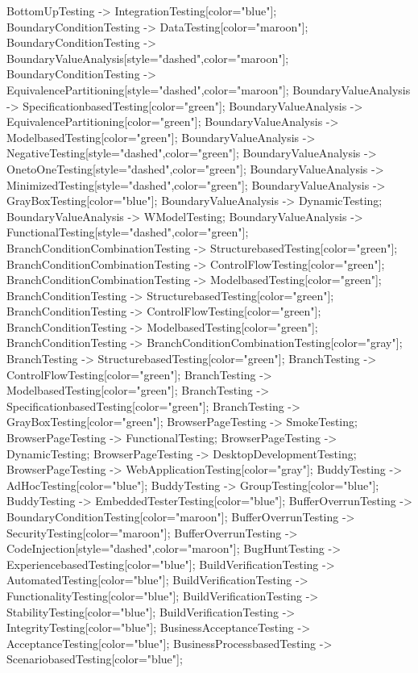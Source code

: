 \documentclass{article}
\begin{document}
{BottomUpTesting -> IntegrationTesting[color="blue"];
BoundaryConditionTesting -> DataTesting[color="maroon"];
BoundaryConditionTesting -> BoundaryValueAnalysis[style="dashed",color="maroon"];
BoundaryConditionTesting -> EquivalencePartitioning[style="dashed",color="maroon"];
BoundaryValueAnalysis -> SpecificationbasedTesting[color="green"];
BoundaryValueAnalysis -> EquivalencePartitioning[color="green"];
BoundaryValueAnalysis -> ModelbasedTesting[color="green"];
BoundaryValueAnalysis -> NegativeTesting[style="dashed",color="green"];
BoundaryValueAnalysis -> OnetoOneTesting[style="dashed",color="green"];
BoundaryValueAnalysis -> MinimizedTesting[style="dashed",color="green"];
BoundaryValueAnalysis -> GrayBoxTesting[color="blue"];
BoundaryValueAnalysis -> DynamicTesting;
BoundaryValueAnalysis -> WModelTesting;
BoundaryValueAnalysis -> FunctionalTesting[style="dashed",color="green"];
BranchConditionCombinationTesting -> StructurebasedTesting[color="green"];
BranchConditionCombinationTesting -> ControlFlowTesting[color="green"];
BranchConditionCombinationTesting -> ModelbasedTesting[color="green"];
BranchConditionTesting -> StructurebasedTesting[color="green"];
BranchConditionTesting -> ControlFlowTesting[color="green"];
BranchConditionTesting -> ModelbasedTesting[color="green"];
BranchConditionTesting -> BranchConditionCombinationTesting[color="gray"];
BranchTesting -> StructurebasedTesting[color="green"];
BranchTesting -> ControlFlowTesting[color="green"];
BranchTesting -> ModelbasedTesting[color="green"];
BranchTesting -> SpecificationbasedTesting[color="green"];
BranchTesting -> GrayBoxTesting[color="green"];
BrowserPageTesting -> SmokeTesting;
BrowserPageTesting -> FunctionalTesting;
BrowserPageTesting -> DynamicTesting;
BrowserPageTesting -> DesktopDevelopmentTesting;
BrowserPageTesting -> WebApplicationTesting[color="gray"];
BuddyTesting -> AdHocTesting[color="blue"];
BuddyTesting -> GroupTesting[color="blue"];
BuddyTesting -> EmbeddedTesterTesting[color="blue"];
BufferOverrunTesting -> BoundaryConditionTesting[color="maroon"];
BufferOverrunTesting -> SecurityTesting[color="maroon"];
BufferOverrunTesting -> CodeInjection[style="dashed",color="maroon"];
BugHuntTesting -> ExperiencebasedTesting[color="blue"];
BuildVerificationTesting -> AutomatedTesting[color="blue"];
BuildVerificationTesting -> FunctionalityTesting[color="blue"];
BuildVerificationTesting -> StabilityTesting[color="blue"];
BuildVerificationTesting -> IntegrityTesting[color="blue"];
BusinessAcceptanceTesting -> AcceptanceTesting[color="blue"];
BusinessProcessbasedTesting -> ScenariobasedTesting[color="blue"];
}
\end{document}
